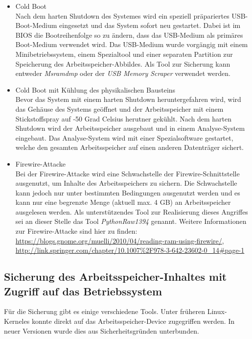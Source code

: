 \begin{itemize}
\item Cold Boot\\
Nach dem harten Shutdown des Systemes wird ein speziell präpariertes USB-Boot-Medium eingesetzt und das System sofort neu gestartet. Dabei ist im BIOS die Bootreihenfolge so zu ändern, dass das USB-Medium als primäres Boot-Medium verwendet wird. Das USB-Medium wurde vorgängig mit einem Minibetriebssystem, einem Spezialtool und einer separaten Partition zur Speicherung des Arbeitsspeicher-Abbildes. Als Tool zur Sicherung kann entweder \textit{Msramdmp} oder der \textit{USB Memory Scraper} verwendet werden.

\item Cold Boot mit Kühlung des physikalischen Bausteins\\
Bevor das System mit einem harten Shutdown heruntergefahren wird, wird das Gehäuse des Systems geöffnet und der Arbeitsspeicher mit einem Stickstoffspray auf -50 Grad Celsius herutner gekühlt. Nach dem harten Shutdown wird der Arbeitsspeicher ausgebaut und in einem Analyse-System  eingebaut. Das Analyse-System wird mit einer Spezialsoftware gestartet, welche den gesamten Arbeitsspeicher auf einen anderen Datenträger sichert.

\item Firewire-Attacke\\
Bei der Firewire-Attacke wird eine Schwachstelle der Firewire-Schnittstelle ausgenutzt, um Inhalte des Arbeitsspeichers zu sichern. Die Schwachstelle kann jedoch nur unter bestimmten Bedingungen ausgenutzt werden und es kann nur eine begrenzte Menge (aktuell max. 4 GB) an Arbeitsspeicher ausgelesen werden. Als unterstützendes Tool zur Realisierung dieses Angriffes sei an dieser Stelle das Tool \textit{PythonRaw1394} genannt. Weitere Informationen zur Firewire-Attacke sind hier zu finden: \url{https://blogs.gnome.org/muelli/2010/04/reading-ram-using-firewire/}, \url{http://link.springer.com/chapter/10.1007%2F978-3-642-23602-0_14#page-1}
\end{itemize}

\subsection{Sicherung des Arbeitsspeicher-Inhaltes mit Zugriff auf das Betriebssystem}
Für die Sicherung gibt es einige verschiedene Tools. Unter früheren Linux-Kerneles konnte direkt auf das Arbeitsspeicher-Device zugegriffen werden. In neuer Versionen wurde dies aus Sicherheitsgründen unterbunden.


